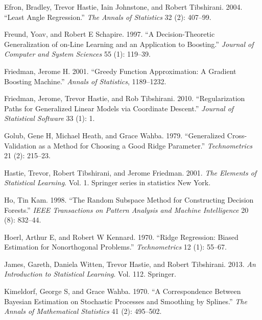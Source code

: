 \documentclass[
]{book}
\newlength{\cslhangindent}
\newlength{\cslentryspacingunit} %
\newenvironment{CSLReferences}[2] %
 {%
  \setlength{\parindent}{0pt}
  \ifodd #1
  \let\oldpar\par
  \def\par{\hangindent=\cslhangindent\oldpar}
  \fi
  \setlength{\parskip}{#2\cslentryspacingunit}
 }%
 {}
\theoremstyle{definition}
\theoremstyle{definition}
\theoremstyle{definition}
\theoremstyle{definition}
\theoremstyle{remark}
\begin{document}
\begin{CSLReferences}{1}{0}
\leavevmode{}%
Efron, Bradley, Trevor Hastie, Iain Johnstone, and Robert Tibshirani. 2004. {``Least Angle Regression.''} \emph{The Annals of Statistics} 32 (2): 407--99.

\leavevmode{}%
Freund, Yoav, and Robert E Schapire. 1997. {``A Decision-Theoretic Generalization of on-Line Learning and an Application to Boosting.''} \emph{Journal of Computer and System Sciences} 55 (1): 119--39.

\leavevmode{}%
Friedman, Jerome H. 2001. {``Greedy Function Approximation: A Gradient Boosting Machine.''} \emph{Annals of Statistics}, 1189--1232.

\leavevmode{}%
Friedman, Jerome, Trevor Hastie, and Rob Tibshirani. 2010. {``Regularization Paths for Generalized Linear Models via Coordinate Descent.''} \emph{Journal of Statistical Software} 33 (1): 1.

\leavevmode{}%
Golub, Gene H, Michael Heath, and Grace Wahba. 1979. {``Generalized Cross-Validation as a Method for Choosing a Good Ridge Parameter.''} \emph{Technometrics} 21 (2): 215--23.

\leavevmode{}%
Hastie, Trevor, Robert Tibshirani, and Jerome Friedman. 2001. \emph{The Elements of Statistical Learning}. Vol. 1. Springer series in statistics New York.

\leavevmode{}%
Ho, Tin Kam. 1998. {``The Random Subspace Method for Constructing Decision Forests.''} \emph{IEEE Transactions on Pattern Analysis and Machine Intelligence} 20 (8): 832--44.

\leavevmode{}%
Hoerl, Arthur E, and Robert W Kennard. 1970. {``Ridge Regression: Biased Estimation for Nonorthogonal Problems.''} \emph{Technometrics} 12 (1): 55--67.

\leavevmode{}%
James, Gareth, Daniela Witten, Trevor Hastie, and Robert Tibshirani. 2013. \emph{An Introduction to Statistical Learning}. Vol. 112. Springer.

\leavevmode{}%
Kimeldorf, George S, and Grace Wahba. 1970. {``A Correspondence Between Bayesian Estimation on Stochastic Processes and Smoothing by Splines.''} \emph{The Annals of Mathematical Statistics} 41 (2): 495--502.


\end{CSLReferences}
\end{document}
